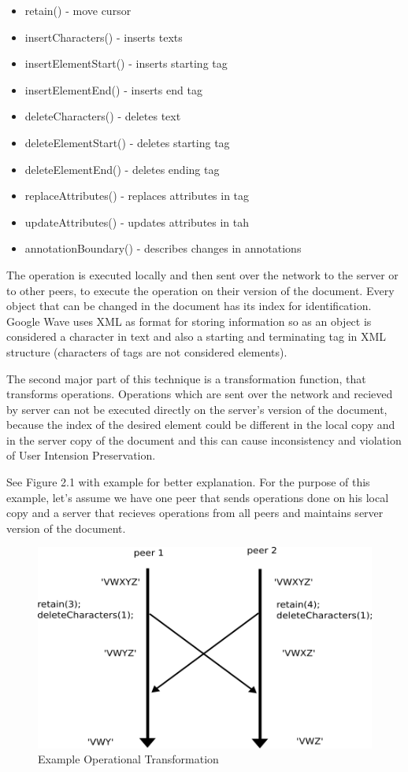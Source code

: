 \documentclass[12pt,oneside]{fithesis2}
\begin{document}
\begin{itemize}
\item retain() - move cursor
\item insertCharacters() - inserts texts
\item insertElementStart() - inserts starting tag
\item insertElementEnd() - inserts end tag
\item deleteCharacters() - deletes text
\item deleteElementStart() - deletes starting tag
\item deleteElementEnd() - deletes ending tag
\item replaceAttributes() - replaces attributes in tag
\item updateAttributes() - updates attributes in tah
\item annotationBoundary() - describes changes in annotations
\end{itemize}
\par The operation is executed locally and then sent over the network to the server or to other peers, to execute the operation on their version of the document. Every object that can be changed in the document has its index for identification. Google Wave uses XML as format for storing information so as an object is considered a character in text and also a starting and terminating tag in XML structure (characters of tags are not considered elements). 
\par The second major part of this technique is a transformation function, that transforms operations. Operations which are sent over the network and recieved by server can not be executed directly on the server's version of the document, because the index of the desired element could be different in the local copy and in the server copy of the document and this can cause inconsistency and violation of User Intension Preservation. 
\par See Figure 2.1 with example for better explanation. For the purpose of this example, let's assume we have one peer that sends operations done on his local copy and a server that recieves operations from all peers and maintains server version of the document. 
\begin{figure}[H]
\caption{Example Operational Transformation}
\centering
\vspace{5mm}
\includegraphics{example}
\end{figure}
\end{document}
